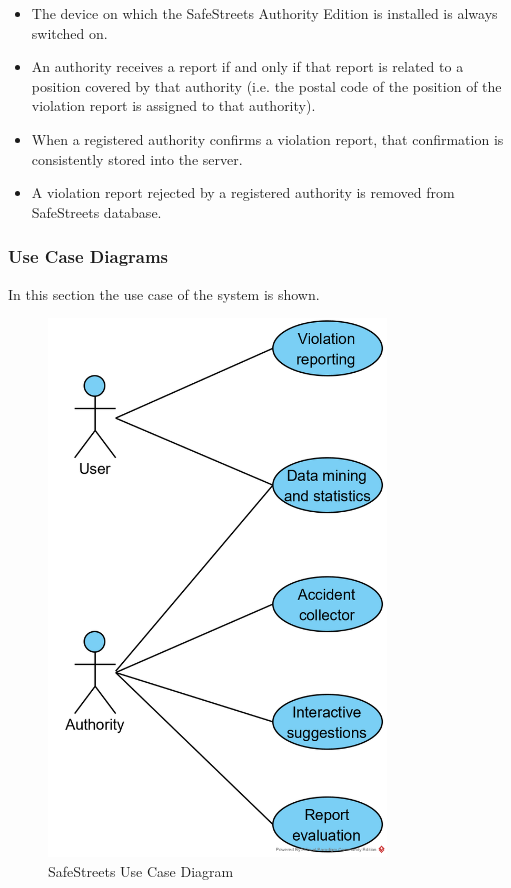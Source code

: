\documentclass{article}
\newcommand\requirement[1]{\item[{[R#1]}] }
\newcommand\assumption[1]{\item[{[A#1]}] }
\begin{document}
\begin{itemize}
\begin{itemize}
					\assumption{13} The device on which the SafeStreets Authority Edition is installed is always switched on.
					\requirement{20} An authority receives a report if and only if that report is related to a position covered by that authority (i.e. the postal code of the position of the violation report is assigned to that authority).
					\requirement{21} When a registered authority confirms a violation report, that confirmation is consistently stored into the server.
					\requirement{22} A violation report rejected by a registered authority is removed from SafeStreets database.
				\end{itemize}
			\end{itemize}
		
			\subsubsection{Use Case Diagrams}
				In this section the use case of the system is shown.
				\begin{figure}[H]
					\centering
					\includegraphics[width=0.8\textwidth]{diagrams/usecase_safestreets.png}
					\caption[SafeStreets use case diagram]{SafeStreets Use Case Diagram}
					\label{fig:usecase_safestreets}
				\end{figure}
			
\end{document}
